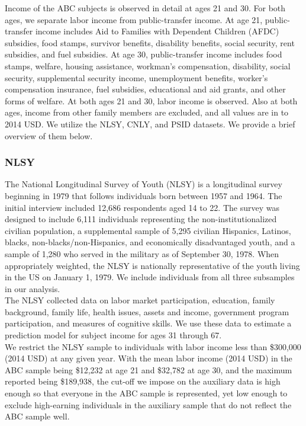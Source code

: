 \noindent Income of the ABC subjects is observed in detail at ages 21 and 30. For both ages,
we separate labor income from public-transfer income. At age 21, public-transfer income includes Aid to
Families with Dependent Children (AFDC) subsidies, food stamps, survivor benefits, disability
benefits, social security, rent subsidies, and fuel subsidies. At age 30, public-transfer income includes food stamps, welfare, housing assistance, workman's
compensation, disability, social security, supplemental security income, unemployment benefits,
worker's compensation insurance, fuel subsidies, educational and aid grants, and other forms of welfare.
At both ages 21 and 30, labor income is observed. Also at both ages, income from other family members are excluded, and all values are in
to 2014 USD. We utilize the
NLSY, CNLY, and PSID datasets. We provide a brief overview of them below. \\

\subsubsection{NLSY}
\label{app:subject_income_nlsy}

\noindent The National Longitudinal Survey of Youth (NLSY) is a longitudinal survey beginning in 1979
that follows individuals born between 1957 and 1964. The initial interview included
12,686 respondents aged 14 to 22. The survey was designed to include 6,111
individuals representing the non-institutionalized civilian population, a supplemental
sample of 5,295 civilian Hispanics, Latinos, blacks, non-blacks/non-Hispanics, and economically
disadvantaged youth, and a sample of 1,280 who served in the military as of September 30,
1978. When appropriately weighted, the NLSY is nationally representative of the youth
living in the US on January 1, 1979. We include individuals from all three subsamples
in our analysis. \\

\noindent The NLSY collected data on labor market participation, education, family background,
family life, health issues, assets and income, government program participation, and
measures of cognitive skills. We use these data to estimate a prediction model for
subject income for ages 31 through 67. \\

\noindent We restrict the NLSY sample to individuals with labor income less than
\$300,000 (2014 USD) at any given year. With the mean labor income (2014 USD) in the ABC
sample being \$12,232 at age 21 and \$32,782 at age 30, and the maximum reported
being \$189,938, the cut-off we impose on the auxiliary data is high enough
so that everyone in the ABC sample is represented, yet low enough to
exclude high-earning individuals in the auxiliary sample that do not reflect the ABC sample well. \\

